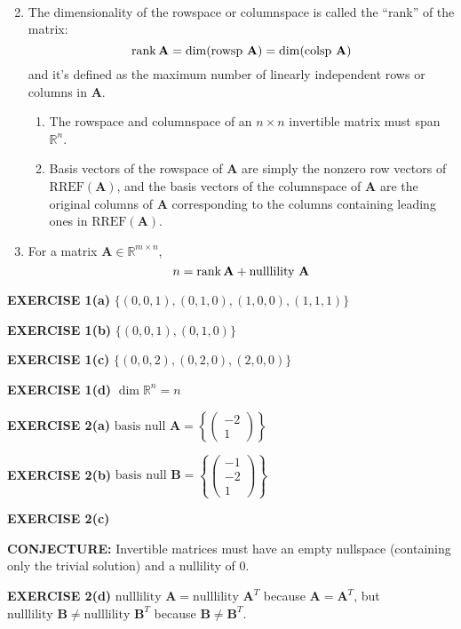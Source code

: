 \documentclass[12pt]{article}
\newcommand{\mat}[1]{\mathbf{#1}}
\newcommand{\exercise}[1]{\textbf{EXERCISE #1}\label{#1}}
\newcommand{\conjecture}[1]{\textbf{CONJECTURE:} #1}
\newcommand{\rref}{\text{RREF}}
\newcommand{\nullsp}{\text{null }}
\newcommand{\nullility}{\text{nulllility }}
\newcommand{\rowsp}{\text{rowsp }}
\newcommand{\colsp}{\text{colsp }}
\newcommand{\basis}{\text{basis }}
\begin{document}
\begin{enumerate}
\begin{gather}
\end{gather}
\item The dimensionality of the rowspace or columnspace is called the ``rank'' of the matrix: 
\begin{equation}
\rank \mat{A} = \dim( \rowsp \mat{A} ) = \dim( \colsp \mat{A} )
\end{equation}
and it's defined as the maximum number of linearly independent rows or columns in $\mat{A}$.
\begin{enumerate}
\item The rowspace and columnspace of an $n \times n$ invertible matrix must span $\mathbb{R}^{n}$.
\item Basis vectors of the rowspace of $\mat{A}$ are simply the nonzero row vectors of $\rref( \mat{A} )$, and the basis vectors of the columnspace of $\mat{A}$ are the original columns of $\mat{A}$ corresponding to the columns containing leading ones in $\rref( \mat{A} )$.
\end{enumerate}
\item For a matrix $\mat{A} \in \mathbb{R}^{m \times n}$,
\begin{equation}
n = \rank \mat{A} + \nullility \mat{A}
\end{equation}
\end{enumerate}

\exercise{1(a)} $\{ (0,0,1), (0,1,0), (1,0,0), (1,1,1) \}$

\exercise{1(b)} $\{ (0,0,1), (0,1,0) \}$

\exercise{1(c)} $\{ (0,0,2), (0,2,0), (2,0,0) \}$

\exercise{1(d)} $\dim \mathbb{R}^{n} = n$

\exercise{2(a)} $\basis \nullsp \mat{A} = \left\{ \begin{pmatrix} -2 \\ 1 \end{pmatrix} \right\}$

\exercise{2(b)} $\basis \nullsp \mat{B} = \left\{ \begin{pmatrix} -1 \\ -2 \\ 1 \end{pmatrix}  \right\}$

\exercise{2(c)}

\conjecture{Invertible matrices must have an empty nullspace (containing only the trivial solution) and a nullility of 0.}

\exercise{2(d)} $\nullility \mat{A} = \nullility \mat{A}^{T}$ because $\mat{A} = \mat{A}^{T}$, but $\nullility \mat{B} \ne \nullility \mat{B}^{T}$ because $\mat{B} \ne \mat{B}^{T}$.
\end{document}
